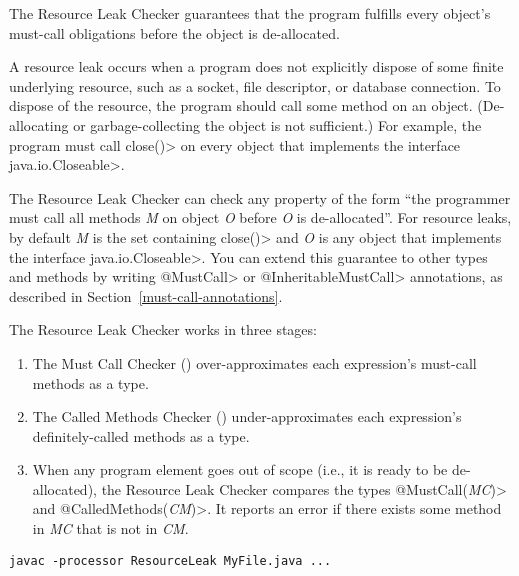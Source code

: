 \htmlhr
{}

The Resource Leak Checker guarantees that the program fulfills every object's
must-call obligations before the object is de-allocated.

A resource leak occurs when a program does not explicitly dispose of some finite
underlying resource, such as a socket, file descriptor, or database connection.  To dispose
of the resource, the program should call some method on an object.
(De-allocating or garbage-collecting the object is not sufficient.)  For
example, the program must call \<close()> on every object that implements the
interface \<java.io.Closeable>.

The Resource Leak Checker can check any property of the form ``the programmer
must call all methods \emph{M} on object \emph{O} before \emph{O} is
de-allocated''.  For resource leaks, by default \emph{M} is the set containing
\<close()> and \emph{O} is any object that implements the interface
\<java.io.Closeable>.  You can extend this guarantee to other types and methods
by writing \<@MustCall> or \<@InheritableMustCall> annotations, as described in
Section~\ref{must-call-annotations}.

The Resource Leak Checker works in three stages:
\begin{enumerate}
\item The Must Call Checker ()
  over-approximates each expression's must-call methods as a
   type.
\item The Called Methods Checker ()
  under-approximates each expression's definitely-called methods as a
   type.
\item When any program element goes out of scope (i.e., it is ready to be
  de-allocated), the Resource Leak Checker compares the types
  \<@MustCall(\emph{MC})> and \<@CalledMethods(\emph{CM})>.  It reports an error
  if there exists some method in \emph{MC} that is not in \emph{CM}.
\end{enumerate}



\begin{Verbatim}
javac -processor ResourceLeak MyFile.java ...
\end{Verbatim}

